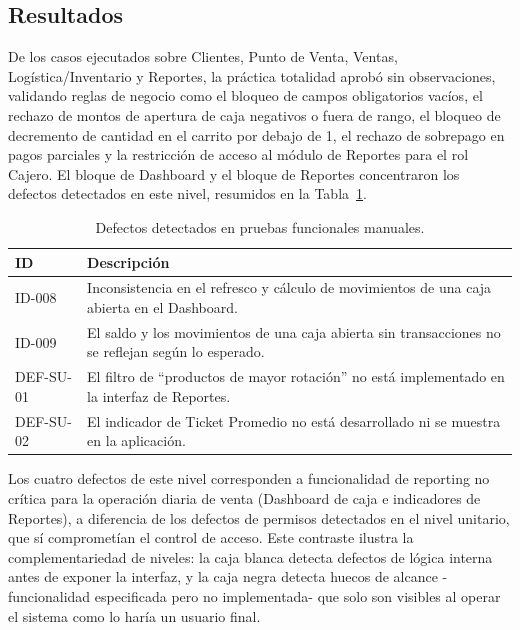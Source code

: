 \documentclass[conference]{IEEEtran}
\begin{document}
\subsection{Resultados}

De los casos ejecutados sobre Clientes, Punto de Venta, Ventas, Logística/Inventario y Reportes, la práctica totalidad aprobó sin observaciones, validando reglas de negocio como el bloqueo de campos obligatorios vacíos, el rechazo de montos de apertura de caja negativos o fuera de rango, el bloqueo de decremento de cantidad en el carrito por debajo de 1, el rechazo de sobrepago en pagos parciales y la restricción de acceso al módulo de Reportes para el rol Cajero. El bloque de Dashboard y el bloque de Reportes concentraron los defectos detectados en este nivel, resumidos en la Tabla~\ref{tab:funcdefects}.

\begin{table}[htbp]
  \caption{Defectos detectados en pruebas funcionales manuales.}
  \label{tab:funcdefects}
  \centering
  \footnotesize
  \begin{tabular}{l p{5.3cm}}
    \toprule
    \textbf{ID} & \textbf{Descripción} \\
    \midrule
    ID-008 & Inconsistencia en el refresco y cálculo de movimientos de una caja abierta en el Dashboard. \\
    ID-009 & El saldo y los movimientos de una caja abierta sin transacciones no se reflejan según lo esperado. \\
    DEF-SU-01 & El filtro de ``productos de mayor rotación'' no está implementado en la interfaz de Reportes. \\
    DEF-SU-02 & El indicador de Ticket Promedio no está desarrollado ni se muestra en la aplicación. \\
    \bottomrule
  \end{tabular}
\end{table}

Los cuatro defectos de este nivel corresponden a funcionalidad de reporting no crítica para la operación diaria de venta (Dashboard de caja e indicadores de Reportes), a diferencia de los defectos de permisos detectados en el nivel unitario, que sí comprometían el control de acceso. Este contraste ilustra la complementariedad de niveles: la caja blanca detecta defectos de lógica interna antes de exponer la interfaz, y la caja negra detecta huecos de alcance -funcionalidad especificada pero no implementada- que solo son visibles al operar el sistema como lo haría un usuario final.
\end{document}
